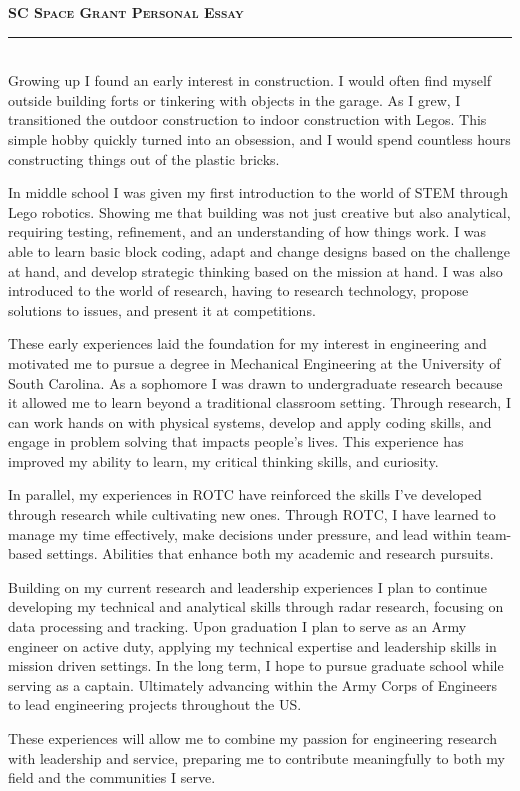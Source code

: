 \documentclass[12pt]{article}
\begin{document}
{\color{garnet}\large\textbf{\textsc{SC Space Grant Personal Essay}}}\\[-0.8em]
{\color{garnet}\rule{\textwidth}{0.5pt}}\\[0.2em]
Growing up I found an early interest in construction. I would often find myself outside building forts or tinkering with objects in the garage. As I grew, I transitioned the outdoor construction to indoor construction with Legos. This simple hobby quickly turned into an obsession, and I would spend countless hours constructing things out of the plastic bricks.

In middle school I was given my first introduction to the world of STEM through Lego robotics. Showing me that building was not just creative but also analytical, requiring testing, refinement, and an understanding of how things work. I was able to learn basic block coding, adapt and change designs based on the challenge at hand, and develop strategic thinking based on the mission at hand. I was also introduced to the world of research, having to research technology, propose solutions to issues, and present it at competitions.

These early experiences laid the foundation for my interest in engineering and motivated me to pursue a degree in Mechanical Engineering at the University of South Carolina. As a sophomore I was drawn to undergraduate research because it allowed me to learn beyond a traditional classroom setting. Through research, I can work hands on with physical systems, develop and apply coding skills, and engage in problem solving that impacts people's lives. This experience has improved my ability to learn, my critical thinking skills, and curiosity.

In parallel, my experiences in ROTC have reinforced the skills I've developed through research while cultivating new ones. Through ROTC, I have learned to manage my time effectively, make decisions under pressure, and lead within team-based settings. Abilities that enhance both my academic and research pursuits.

Building on my current research and leadership experiences I plan to continue developing my technical and analytical skills through radar research, focusing on data processing and tracking. Upon graduation I plan to serve as an Army engineer on active duty, applying my technical expertise and leadership skills in mission driven settings. In the long term, I hope to pursue graduate school while serving as a captain. Ultimately advancing within the Army Corps of Engineers to lead engineering projects throughout the US.

These experiences will allow me to combine my passion for engineering research with leadership and service, preparing me to contribute meaningfully to both my field and the communities I serve.
\end{document}
